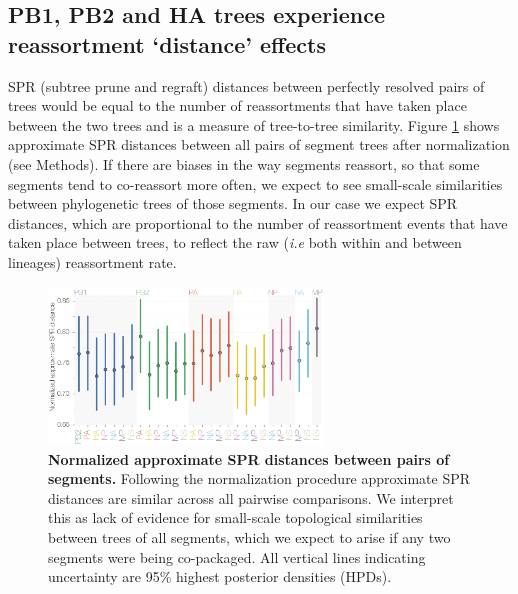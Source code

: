 \documentclass[11pt,oneside,letterpaper]{article}
\begin{document}
\subsection*{PB1, PB2 and HA trees experience reassortment `distance' effects}
SPR (subtree prune and regraft) distances between perfectly resolved pairs of trees would be equal to the number of reassortments that have taken place between the two trees and is a measure of tree-to-tree similarity.
Figure \ref{SPRdistances} shows approximate SPR distances between all pairs of segment trees after normalization (see Methods).
If there are biases in the way segments reassort, so that some segments tend to co-reassort more often, we expect to see small-scale similarities between phylogenetic trees of those segments.
In our case we expect SPR distances, which are proportional to the number of reassortment events that have taken place between trees, to reflect the raw (\textit{i.e} both within and between lineages) reassortment rate.

\begin{figure}[h]
	\centering		
	\includegraphics[width=0.65\textwidth]{figures/InfB_normalizedApproxSPR.png}
	\caption{\textbf{Normalized approximate SPR distances between pairs of segments.}
Following the normalization procedure approximate SPR distances are similar across all pairwise comparisons.
We interpret this as lack of evidence for small-scale topological similarities between trees of all segments, which we expect to arise if any two segments were being co-packaged.
All vertical lines indicating uncertainty are 95\% highest posterior densities (HPDs).}
	\label{SPRdistances}
\end{figure}
\end{document}
